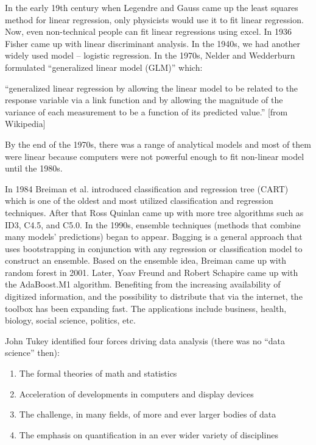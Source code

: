\documentclass[12pt,]{krantz}
\providecommand{\tightlist}{%
  \setlength{\itemsep}{0pt}\setlength{\parskip}{0pt}}
\renewenvironment{quote}{\begin{VF}}{\end{VF}}
\theoremstyle{definition}
\theoremstyle{definition}
\theoremstyle{remark}
\begin{document}
In the early 19th century when Legendre and Gauss came up the least
squares method for linear regression, only physicists would use it to
fit linear regression. Now, even non-technical people can fit linear
regressions using excel. In 1936 Fisher came up with linear discriminant
analysis. In the 1940s, we had another widely used model -- logistic
regression. In the 1970s, Nelder and Wedderburn formulated ``generalized
linear model (GLM)'' which:

\begin{quote}
``generalized linear regression by allowing the linear model to be
related to the response variable via a link function and by allowing the
magnitude of the variance of each measurement to be a function of its
predicted value.'' {[}from Wikipedia{]}
\end{quote}

By the end of the 1970s, there was a range of analytical models and most
of them were linear because computers were not powerful enough to fit
non-linear model until the 1980s.

In 1984 Breiman et al. introduced classification and regression tree
(CART) which is one of the oldest and most utilized classification and
regression techniques. After that Ross Quinlan came up with more tree
algorithms such as ID3, C4.5, and C5.0. In the 1990s, ensemble
techniques (methods that combine many models' predictions) began to
appear. Bagging is a general approach that uses bootstrapping in
conjunction with any regression or classification model to construct an
ensemble. Based on the ensemble idea, Breiman came up with random forest
in 2001. Later, Yoav Freund and Robert Schapire came up with the
AdaBoost.M1 algorithm. Benefiting from the increasing availability of
digitized information, and the possibility to distribute that via the
internet, the toolbox has been expanding fast. The applications include
business, health, biology, social science, politics, etc.

John Tukey identified four forces driving data analysis (there was no
``data science'' then):

\begin{enumerate}
\def\labelenumi{\arabic{enumi}.}
\tightlist
\item
  The formal theories of math and statistics
\item
  Acceleration of developments in computers and display devices
\item
  The challenge, in many fields, of more and ever larger bodies of data
\item
  The emphasis on quantification in an ever wider variety of disciplines
\end{enumerate}
\end{document}
